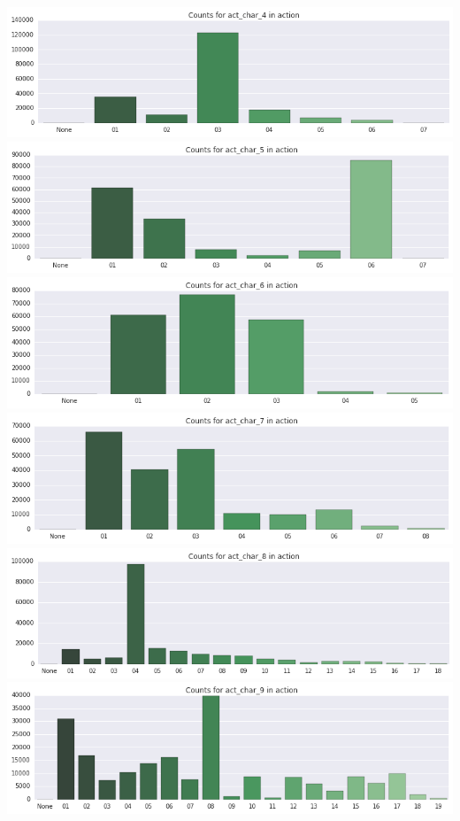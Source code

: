 \documentclass[]{report}
\begin{document}
\includegraphics{BarPlots_files/BarPlots_6_3.png}
\includegraphics{BarPlots_files/BarPlots_6_4.png}
\includegraphics{BarPlots_files/BarPlots_6_5.png}
\includegraphics{BarPlots_files/BarPlots_6_6.png}
\includegraphics{BarPlots_files/BarPlots_6_7.png}
\includegraphics{BarPlots_files/BarPlots_6_8.png}
\end{document}
